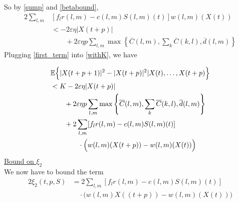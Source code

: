 So by \eqref{sump} and \eqref{betabound}, 
\begin{align}  \label{first_term}
2\sum_{l,m} & [f_{l}r(l,m) - c(l,m)S(l,m)(t) ]w(l,m)(X(t))  \\ \nonumber
&  < -2\varepsilon \eta  \vert X(t + p) \vert \\ \nonumber
& \qquad + 2\varepsilon \eta  p \sum_{l,m} \max\left\{ \overline{C}(l,m),\sum_{k}\overline{C}(k,l),\overline d(l,m) \right\} 
\end{align}
Plugging \eqref{first_term} into \eqref{withK}, we have

\begin{align} \nonumber
&\expectation{\vert X(t + p +  1)\vert^2 - \vert  X(t + p)\vert^2 \vert X(t),\ldots,X(t + p)}  \\ \nonumber
& < K  -2 \varepsilon \eta \vert X(t + p) \vert  \\ \nonumber
&\qquad + 2\varepsilon \eta p \sum_{l,m} \max\left\{ \overline{C}(l,m),\sum_{k}\overline{C}(k,l),\overline d(l,m) \right\} \\ \nonumber
&  \qquad +2 \sum_{l,m} [f_{l}r(l,m) - c(l,m)S(l,m)(t) ]\\
&\qquad \qquad \cdot\Big(w(l,m)(X(t + p) ) - w(l,m)(X(t))\Big) \label{combined1}
\end{align}
%
\underline{Bound on $\xi_{2}$} \\
We now have to bound the term
\begin{align}\nonumber
2\xi_2(t,p,S) &= 2\sum_{l,m} [f_{l}r(l,m) - c(l,m)S(l,m)(t) ]\\
&\quad \cdot \Big(w(l,m)X((t + p) ) - w(l,m)(X(t))\Big)
\label{2xi2}
\end{align}
%
%
